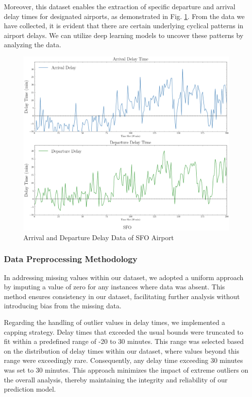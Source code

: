 \documentclass[conference]{IEEEtran}
\begin{document}
Moreover, this dataset enables the extraction of specific departure and arrival delay times for designated airports, as demonstrated in Fig. \ref{fig: SFO Delay Data}. From the data we have collected, it is evident that there are certain underlying cyclical patterns in airport delays. We can utilize deep learning models to uncover these patterns by analyzing the data.


\begin{figure}
    \centering
    \includegraphics[width=1\linewidth]{SFO.png}
    \caption{Arrival and Departure Delay Data of SFO Airport}
    \label{fig: SFO Delay Data}
\end{figure}

\subsubsection{Data Preprocessing Methodology}

In addressing missing values within our dataset, we adopted a uniform approach by imputing a value of zero for any instances where data was absent. This method ensures consistency in our dataset, facilitating further analysis without introducing bias from the missing data.

Regarding the handling of outlier values in delay times, we implemented a capping strategy. Delay times that exceeded the usual bounds were truncated to fit within a predefined range of -20 to 30 minutes. This range was selected based on the distribution of delay times within our dataset, where values beyond this range were exceedingly rare. Consequently, any delay time exceeding 30 minutes was set to 30 minutes. This approach minimizes the impact of extreme outliers on the overall analysis, thereby maintaining the integrity and reliability of our prediction model.
\end{document}
